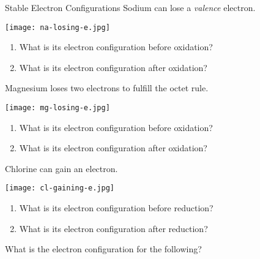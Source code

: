 \documentclass[handout]{beamer}
\begin{document}
\begin{frame}[allowframebreaks]{Stable Electron Configurations}
	Sodium can \alert{lose} a \emph{valence} electron.

	\begin{center}
		\texttt{[image: na-losing-e.jpg]}
	\end{center}

	\begin{enumerate}
		\item What is its electron configuration \alert{before}
			oxidation?

			\bigskip

		\item What is its electron configuration \alert{after} oxidation?
	\end{enumerate}
	
	\framebreak

	Magnesium loses two electrons to fulfill the octet rule.

	\begin{center}
		\texttt{[image: mg-losing-e.jpg]}
	\end{center}

	\begin{enumerate}
		\item What is its electron configuration \alert{before}
			oxidation?

			\bigskip

		\item What is its electron configuration \alert{after} oxidation?
	\end{enumerate}
	
	\framebreak
	
	Chlorine can \alert{gain} an electron.

	\begin{center}
		\texttt{[image: cl-gaining-e.jpg]}
	\end{center}

	\begin{enumerate}
		\item What is its electron configuration \alert{before}
			reduction?

			\bigskip

		\item What is its electron configuration \alert{after} reduction?
	\end{enumerate}

	\framebreak

	What is the electron configuration for the following?


\end{frame}
\end{document}
